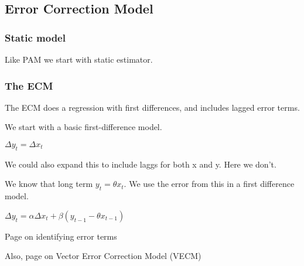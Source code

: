 
\subsection{Error Correction Model}

\subsubsection{Static model}

Like PAM we start with static estimator.

\subsubsection{The ECM}

The ECM does a regression with first differences, and includes lagged error terms.

We start with a basic first-difference model. 

\(\Delta y_t= \Delta x_t\)

We could also expand this to include laggs for both x and y. Here we don't.

We know that long term \(y_t=\theta x_t\). We use the error from this in a first difference model. 

\(\Delta y_t= \alpha \Delta x_t + \beta (y_{t-1}-\theta x_{t-1})\)

Page on identifying error terms 

Also, page on Vector Error Correction Model (VECM)

